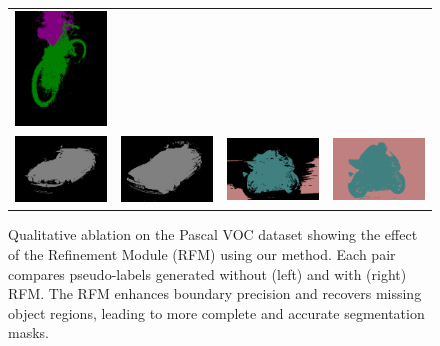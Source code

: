 \begin{figure}[thbp]
{\begin{tabular}{c c c c}
        \includegraphics[width=0.18\linewidth, height=0.18\linewidth]{figures/ablation/withrfm/2010_003912_[1, 4]} \\
        [1mm]
        \includegraphics[width=0.18\linewidth, height=0.18\linewidth]{figures/ablation/withoutrfm/2010_003276_[6]} &
        \includegraphics[width=0.18\linewidth, height=0.18\linewidth]{figures/ablation/withrfm/2010_003276_[6]} & \hspace{2pt}
        \includegraphics[width=0.18\linewidth, height=0.18\linewidth]{figures/ablation/withoutrfm/2009_000074_[13, 14]} &
        \includegraphics[width=0.18\linewidth, height=0.18\linewidth]{figures/ablation/withrfm/2009_000074_[13, 14]} \\
      \end{tabular}
  }

  \caption{Qualitative ablation on the Pascal VOC dataset showing the effect of the Refinement Module (RFM) \cite{wsss_frozen_clip} using our method. Each pair compares pseudo-labels generated without (left) and with (right) RFM. The RFM enhances boundary precision and recovers missing object regions, leading to more complete and accurate segmentation masks.}
  \label{fig:qualitative_ablation}
\end{figure}

